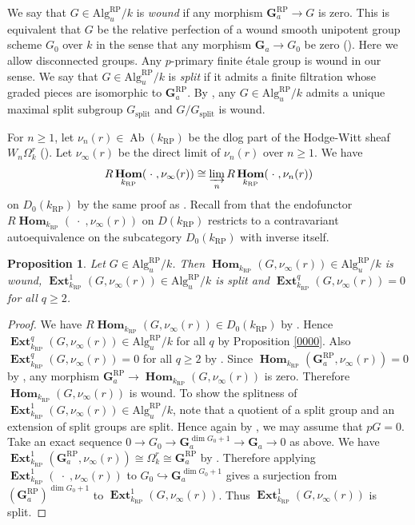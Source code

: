 \documentclass{amsart}
\newtheorem{Prop}[Thm]{Proposition}
\theoremstyle{remark}
\numberwithin{equation}{section}
\newcommand{\into}{\hookrightarrow}
\newcommand{\Ga}{\mathbf{G}_{a}}
\newcommand{\dirlim}{\varinjlim}
\newcommand{\Alg}{\mathrm{Alg}}
\newcommand{\alg}[1]{\mathbf{#1}}
\newcommand{\var}{\;\cdot\;}
\newcommand{\RP}{\mathrm{RP}}
\DeclareMathOperator{\Ab}{Ab}
\DeclareMathOperator{\sheafhom}{\alg{Hom}}
\DeclareMathOperator{\sheafext}{\alg{Ext}}
\begin{document}
We say that $G \in \Alg^{\RP}_{u} / k$ is \emph{wound}
if any morphism $\Ga^{\RP} \to G$ is zero.
This is equivalent that $G$ be the relative perfection
of a wound smooth unipotent group scheme $G_{0}$ over $k$
in the sense that any morphism $\Ga \to G_{0}$ be zero (\cite[Definition B.2.1]{CGP15}).
Here we allow disconnected groups.
Any $p$-primary finite \'etale group is wound in our sense.
We say that $G \in \Alg^{\RP}_{u} / k$ is \emph{split}
if it admits a finite filtration whose graded pieces are isomorphic to $\Ga^{\RP}$.
\newcommand{\spl}{\mathrm{split}}
By \cite[Theorem B.3.4]{CGP15},
any $G \in \Alg^{\RP}_{u} / k$ admits a unique maximal split subgroup $G_{\spl}$
and $G / G_{\spl}$ is wound.

For $n \ge 1$, let $\nu_{n}(r) \in \Ab(k_{\RP})$ be 
the dlog part of the Hodge-Witt sheaf $W_{n} \Omega_{k}^{r}$ (\cite[Section 4]{Kat86}).
Let $\nu_{\infty}(r)$ be the direct limit of $\nu_{n}(r)$ over $n \ge 1$.
We have
	\[
			R \sheafhom_{k_{\RP}}(\var, \nu_{\infty}(r))
		\cong
			\dirlim_{n}
			R \sheafhom_{k_{\RP}}(\var, \nu_{n}(r))
	\]
on $D_{0}(k_{\RP})$
by the same proof as \cite[Proposition 8.10]{BS20}.
Recall from \cite[Theorem 4.3]{Kat86} that
the endofunctor $R \sheafhom_{k_{\RP}}(\var, \nu_{\infty}(r))$ on $D(k_{\RP})$
restricts to a contravariant autoequivalence on the subcategory $D_{0}(k_{\RP})$
with inverse itself.

\begin{Prop} \label{0002}
	Let $G \in \Alg^{\RP}_{u} / k$.
	Then $\sheafhom_{k_{\RP}}(G, \nu_{\infty}(r)) \in \Alg^{\RP}_{u} / k$ is wound,
	$\sheafext_{k_{\RP}}^{1}(G, \nu_{\infty}(r)) \in \Alg^{\RP}_{u} / k$ is split
	and $\sheafext_{k_{\RP}}^{q}(G, \nu_{\infty}(r)) = 0$ for all $q \ge 2$.
\end{Prop}

\begin{proof}
	We have $R \sheafhom_{k_{\RP}}(G, \nu_{\infty}(r)) \in D_{0}(k_{\RP})$
	by \cite[Theorem 4.3 (ii)]{Kat86}.
	Hence $\sheafext_{k_{\RP}}^{q}(G, \nu_{\infty}(r)) \in \Alg^{\RP}_{u} / k$
	for all $q$ by Proposition \ref{0000}.
	Also $\sheafext_{k_{\RP}}^{q}(G, \nu_{\infty}(r)) = 0$ for all $q \ge 2$
	by \cite[Theorem 3.2]{Kat86}.
	Since $\sheafhom_{k_{\RP}}(\Ga^{\RP}, \nu_{\infty}(r)) = 0$
	by \cite[Theorem 3.2 (ii)]{Kat86},
	any morphism $\Ga^{\RP} \to \sheafhom_{k_{\RP}}(G, \nu_{\infty}(r))$ is zero.
	Therefore $\sheafhom_{k_{\RP}}(G, \nu_{\infty}(r))$ is wound.
	To show the splitness of $\sheafext_{k_{\RP}}^{1}(G, \nu_{\infty}(r)) \in \Alg^{\RP}_{u} / k$,
	note that a quotient of a split group and an extension of split groups are split.
	Hence again by \cite[Corollary B.3.3]{CGP15},
	we may assume that $p G = 0$.
	Take an exact sequence $0 \to G_{0} \to \Ga^{\dim G_{0} + 1} \to \Ga \to 0$ as above.
	We have $\sheafext_{k_{\RP}}^{1}(\Ga^{\RP}, \nu_{\infty}(r)) \cong \Omega_{k}^{r} \cong \Ga^{\RP}$
	by \cite[Theorem 3.2 (ii)]{Kat86}.
	Therefore applying $\sheafext_{k_{\RP}}^{1}(\var, \nu_{\infty}(r))$ to $G_{0} \into \Ga^{\dim G_{0} + 1}$ gives
	a surjection from $(\Ga^{\RP})^{\dim G_{0} + 1}$ to $\sheafext_{k_{\RP}}^{1}(G, \nu_{\infty}(r))$.
	Thus $\sheafext_{k_{\RP}}^{1}(G, \nu_{\infty}(r))$ is split.
\end{proof}
\end{document}
